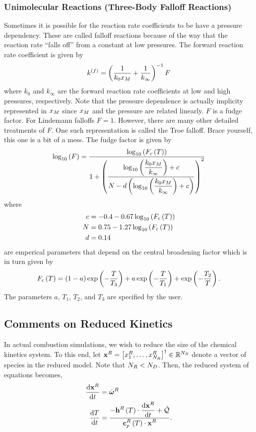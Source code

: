 \subsubsection{Unimolecular Reactions (Three-Body Falloff Reactions)}
Sometimes it is possible for the reaction rate coefficients to be 
have a pressure dependency.  These are called falloff reactions 
because of the way that the reaction rate ``falls off'' from a 
constant at low pressures.  The forward reaction rate coefficient 
is given by 
\begin{align}
  k_{}^{\left(f\right)} = \left(\frac{1}{k_{0}x_{M}} + \frac{1}{k_{\infty}}\right)^{-1}F
\end{align}
where $k_{0}$ and $k_{\infty}$ are the forward reaction rate 
coefficients at low and high pressures, respectively.  Note that 
the pressure dependence is actually implicity represented in $x_{M}$ 
since $x_{M}$ and the pressure are related linearly.  $F$ is 
a fudge factor.  For Lindemann falloffs $F = 1$. 
However, there are many other detailed treatments of $F$.  One 
such representation is called the Troe falloff.  Brace yourself, 
this one is a bit of a mess.  The fudge factor is 
given by
\begin{align}
  \log_{10}\left(F\right) = \frac{\displaystyle \log_{10}\left(F_{c}\left(T\right)\right)}
    {\displaystyle 1 + \left(\frac{\displaystyle\log_{10}\left(\frac{k_{0}x_{M}}{k_{\infty}}\right) + c}{\displaystyle N - d\left(\log_{10}\left(\frac{k_{0}x_{M}}{k_{\infty}}\right) + c\right)}\right)^{2}}
\end{align}
where 
\begin{align}
  c &= -0.4 - 0.67\log_{10}\left(F_{c}\left(T\right)\right) \\
  N &= 0.75 - 1.27\log_{10}\left(F_{c}\left(T\right)\right) \\
  d &= 0.14
\end{align}
are emperical parameters that depend on the central broadening factor which 
is in turn given by 
\begin{align}
  F_{c}\left(T\right) = \left(1-a\right)\exp\left(-\frac{T}{T_{3}}\right) + 
                      a \exp\left(-\frac{T}{T_{1}}\right) + 
                        \exp\left(-\frac{T_{2}}{T}\right).
\end{align}
The parameters $a$, $T_{1}$, $T_{2}$, and $T_{3}$ are specified by the 
user.

\subsection{Comments on Reduced Kinetics}
In actual combustion simulations, we wish to reduce the size of the chemical kinetics system.  
To this end, let $\mathbf{x}^{R} = \left[x_{1}^{R}, \ldots, x_{N_{R}}^{R}\right]^{\dagger} \in \mathbb{R}^{N_{R}}$ 
denote a vector of species in the reduced model.  Note that $N_{R} < N_{D}$.  Then, the reduced 
system of equations becomes,
\begin{align}
  \frac{\mathrm{d} \mathbf{x}^{R}}{\mathrm{d} t} &= \dot{\boldsymbol{\omega}}^{R} \label{eq:reduced}\\
  \frac{\mathrm{d} T}{\mathrm{d} t}   &= \frac{\displaystyle -\mathbf{h}^{R}\left(T\right)\cdot\frac{\mathrm{d} \mathbf{x}^{R}}{\mathrm{d} t} + \dot{\mathcal{Q}}}{\displaystyle \mathbf{c}_{p}^{R}\left(T\right)\cdot\mathbf{x}^{R}}. \label{eq:reduced_T}
\end{align}

